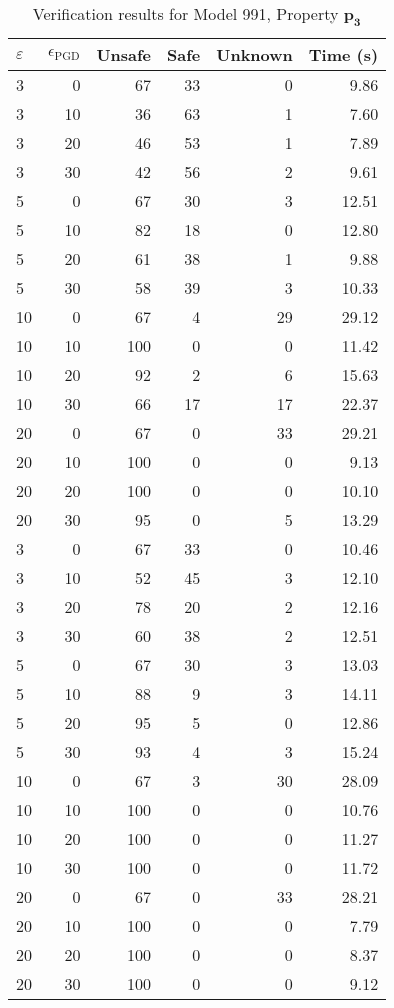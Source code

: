 \begin{table}[htbp]
\centering
\caption{Verification results for Model 991, Property $\mathbf{p_{3}}$}
\label{tab:model991_r3_part4}
\begin{tabular}{lrrrrr}
\toprule
$\varepsilon$ & $\epsilon_{\scriptscriptstyle\mathrm{PGD}}$ & Unsafe & Safe & Unknown & Time (s) \\
\midrule
3 & 0 & 67 & 33 & 0 & 9.86 \\
3 & 10 & 36 & 63 & 1 & 7.60 \\
3 & 20 & 46 & 53 & 1 & 7.89 \\
3 & 30 & 42 & 56 & 2 & 9.61 \\
5 & 0 & 67 & 30 & 3 & 12.51 \\
5 & 10 & 82 & 18 & 0 & 12.80 \\
5 & 20 & 61 & 38 & 1 & 9.88 \\
5 & 30 & 58 & 39 & 3 & 10.33 \\
10 & 0 & 67 & 4 & 29 & 29.12 \\
10 & 10 & 100 & 0 & 0 & 11.42 \\
10 & 20 & 92 & 2 & 6 & 15.63 \\
10 & 30 & 66 & 17 & 17 & 22.37 \\
20 & 0 & 67 & 0 & 33 & 29.21 \\
20 & 10 & 100 & 0 & 0 & 9.13 \\
20 & 20 & 100 & 0 & 0 & 10.10 \\
20 & 30 & 95 & 0 & 5 & 13.29 \\
3 & 0 & 67 & 33 & 0 & 10.46 \\
3 & 10 & 52 & 45 & 3 & 12.10 \\
3 & 20 & 78 & 20 & 2 & 12.16 \\
3 & 30 & 60 & 38 & 2 & 12.51 \\
5 & 0 & 67 & 30 & 3 & 13.03 \\
5 & 10 & 88 & 9 & 3 & 14.11 \\
5 & 20 & 95 & 5 & 0 & 12.86 \\
5 & 30 & 93 & 4 & 3 & 15.24 \\
10 & 0 & 67 & 3 & 30 & 28.09 \\
10 & 10 & 100 & 0 & 0 & 10.76 \\
10 & 20 & 100 & 0 & 0 & 11.27 \\
10 & 30 & 100 & 0 & 0 & 11.72 \\
20 & 0 & 67 & 0 & 33 & 28.21 \\
20 & 10 & 100 & 0 & 0 & 7.79 \\
20 & 20 & 100 & 0 & 0 & 8.37 \\
20 & 30 & 100 & 0 & 0 & 9.12 \\
\bottomrule
\end{tabular}
\end{table}
